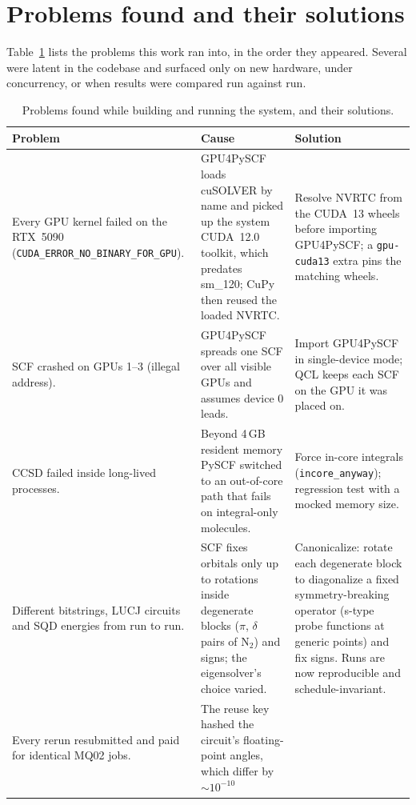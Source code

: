 \documentclass[10pt]{article}
\newcommand{\qcl}{QCL}
\newcommand{\code}[1]{\texttt{#1}}
\begin{document}
\section{Problems found and their solutions}
\label{sec:problems}

Table~\ref{tab:problems} lists the problems this work ran into, in the order they
appeared. Several were latent in the codebase and surfaced only on new hardware, under
concurrency, or when results were compared run against run.

\begin{table}[p]
\centering
\caption{Problems found while building and running the system, and their solutions.}
\label{tab:problems}
\small
\renewcommand{\arraystretch}{1.15}
\begin{tabular}{>{\raggedright\arraybackslash}p{}>{\raggedright\arraybackslash}p{}>{\raggedright\arraybackslash}p{}}
\toprule
Problem & Cause & Solution \\
\midrule
Every GPU kernel failed on the RTX~5090 (\code{CUDA\_ERROR\_NO\_BINARY\_FOR\_GPU}). &
GPU4PySCF loads cuSOLVER by name and picked up the system CUDA~12.0 toolkit, which
predates sm\_120; CuPy then reused the loaded NVRTC. &
Resolve NVRTC from the CUDA~13 wheels before importing GPU4PySCF; a \code{gpu-cuda13}
extra pins the matching wheels. \\
SCF crashed on GPUs 1--3 (illegal address). &
GPU4PySCF spreads one SCF over all visible GPUs and assumes device 0 leads. &
Import GPU4PySCF in single-device mode; \qcl{} keeps each SCF on the GPU it was placed on. \\
CCSD failed inside long-lived processes. &
Beyond 4\,GB resident memory PySCF switched to an out-of-core path that fails on
integral-only molecules. &
Force in-core integrals (\code{incore\_anyway}); regression test with a mocked memory size. \\
Different bitstrings, LUCJ circuits and SQD energies from run to run. &
SCF fixes orbitals only up to rotations inside degenerate blocks ($\pi$, $\delta$ pairs of
N$_2$) and signs; the eigensolver's choice varied. &
Canonicalize: rotate each degenerate block to diagonalize a fixed symmetry-breaking
operator (s-type probe functions at generic points) and fix signs. Runs are now
reproducible and schedule-invariant. \\
Every rerun resubmitted and paid for identical MQ02 jobs. &
The reuse key hashed the circuit's floating-point angles, which differ by $\sim10^{-10}$

\end{tabular}
\end{table}
\end{document}
